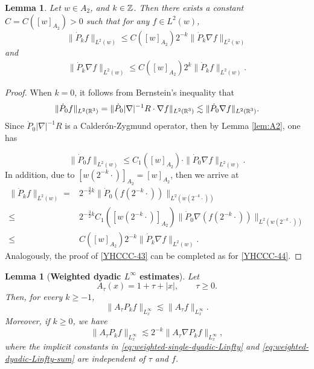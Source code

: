 \documentclass[11pt,twoside]{article}
\def\Z{\mathop{\mathbb Z\kern 0pt}\nolimits}
\def\R{\mathop{\mathbb R\kern 0pt}\nolimits}
\def\f{\frac}
\def\ls{\lesssim}
\newcommand{\pk}{\dot{P}_k}
\newcommand{\Ltw}[1]{\|#1\|_{L^2(w)}}
\newcommand{\Atwo}[1]{[#1]_{A_2}}
\theoremstyle{plain}
\newtheorem{lemma}[theorem]{Lemma}
\theoremstyle{definition}
\theoremstyle{assumption}
\numberwithin{equation}{section}
\begin{document}
	\begin{lemma}\label{lem:weighted bernstein}
		Let $w \in A_2$, and $k\in \Z$. Then there exists a constant $C = C (\Atwo{w})> 0$ such that for any $f \in L^2(w)$,
		\[
		\Ltw{\pk f} \leq C (\Atwo{w}) 2^{-k}\Ltw{\pk \nabla f}
		\]
		and
		\begin{equation}\label{YHCCC-43}
			\begin{split}
				\Ltw{\pk \nabla f} \leq C (\Atwo{w}) 2^{k}\Ltw{\pk f}.
			\end{split}
		\end{equation}
	\end{lemma}
	\begin{proof}
		When $k=0$, it follows from Bernstein's inequality that
		\begin{equation*}
			\|\dot{P}_0 f\|_{L^2(\R^3)}=\|\dot{P}_0 |\nabla|^{-1}R\cdot\nabla f\|_{L^2(\R^3)}\ls  \|\dot{P}_0\nabla f\|_{L^2(\R^3)}.
		\end{equation*}
		Since $\dot{P}_0|\nabla|^{-1}R$ is a Calder\'{o}n-Zygmund operator, then by Lemma \ref{lem:A2}, one has
		
		\[
		\Ltw{\dot{P}_0 f} \leq C_1(\Atwo{w}) \cdot \Ltw{\dot{P}_0 \nabla f}.
		\]
		In addition, due to $\Atwo{w(2^{-k}\cdot)}=\Atwo{w}$, then we arrive at
		\begin{equation}\label{YHCCC-44}
			\begin{split}
				\Ltw{\pk f}  = &2^{-\f32 k}\|\dot{P}_0(f(2^{-k}\cdot))\|_{L^2(w(2^{-k}\cdot))}\\
				\le& 2^{-\f32 k}C_1(\Atwo{w(2^{-k}\cdot)})\|\dot{P}_0\nabla(f(2^{-k}\cdot))\|_{L^2(w(2^{-k}\cdot))}\\
				\le& C (\Atwo{w}) 2^{-k}\Ltw{\pk \nabla f}.
			\end{split}
		\end{equation}
		Analogously, the proof of \eqref{YHCCC-43} can be completed as for \eqref{YHCCC-44}.
	\end{proof}
	
	
	
		\begin{lemma}[{\bf Weighted dyadic \(L^\infty\) estimates}]
		\label{lem:weighted-dyadic-Linfty-sum}
		Let
		\[
		A_\tau(x)=1+\tau+|x|,\qquad \tau\ge0.
		\]
		Then, for every \(k\ge-1\),
		\begin{equation}
			\label{eq:weighted-single-dyadic-Linfty}
			\|A_\tau P_k f\|_{L^\infty_x}
			\ls
			\|A_\tau f\|_{L^\infty_x}.
		\end{equation}
		Moreover, if $k \ge 0$, we have
		\begin{equation}
			\label{eq:weighted-dyadic-Linfty-sum}
			\|A_\tau P_k f\|_{L^\infty_x}
			\ls
			2^{-k}
			\|A_\tau\nabla P_k f\|_{L^\infty_x},
		\end{equation}
		where the implicit constants in \eqref{eq:weighted-single-dyadic-Linfty} and \eqref{eq:weighted-dyadic-Linfty-sum} are independent of \(\tau\) and \(f\).
	\end{lemma}
	
\end{document}
